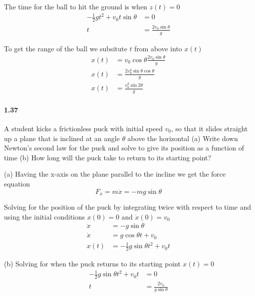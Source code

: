 \documentclass[../problems.tex]{subfiles}
\begin{document}
The time for the ball to hit the ground is when $z(t) = 0$
\begin{align*}
    -\frac{1}{2}gt^2 + v_0 t\sin{\theta} &= 0 \\
    t &= \frac{2v_0 \sin{\theta}}{g}
\end{align*}

To get the range of the ball we subsitute $t$ from above into $x(t)$
\begin{align*}
    x(t) &= v_0 \cos{\theta} \frac{2v_0 \sin{\theta}}{g} \\
    x(t) &= \frac{2v_0^2 \sin{\theta} \cos{\theta}}{g} \\
    x(t) &= \frac{v_0^2 \sin{2\theta}}{g}
\end{align*}

\paragraph{1.37}
A student kicks a frictionless puck with initial speed $v_0$, so that it slides straight up a plane 
that is inclined at an angle $\theta$ above the horizontal (a) Write down Newton’s second law for 
the puck and solve to give its position as a function of time (b) How long will the puck take to 
return to its starting point?
\barh

(a) Having the x-axis on the plane parallel to the incline we get the force equation
\begin{equation*}
    F_x = m\ddot{x} = -mg\sin{\theta}
\end{equation*}

Solving for the position of the puck by integrating twice with respect to time and using the initial 
conditions $x(0) = 0$ and $\dot{x}(0) = v_0$
\begin{align*}
    \ddot{x} &= -g\sin{\theta} \\
    \dot{x} &= g\cos{\theta} t + v_0 \\
    x(t) &= -\frac{1}{2}g\sin{\theta} t^2 + v_0 t
\end{align*}

(b) Solving for when the puck returns to its starting point $x(t) = 0$
\begin{align*}
    -\frac{1}{2}g\sin{\theta} t^2 + v_0 t &= 0 \\
    t &= \frac{2v_0}{g\sin{\theta}}
\end{align*}
\end{document}

